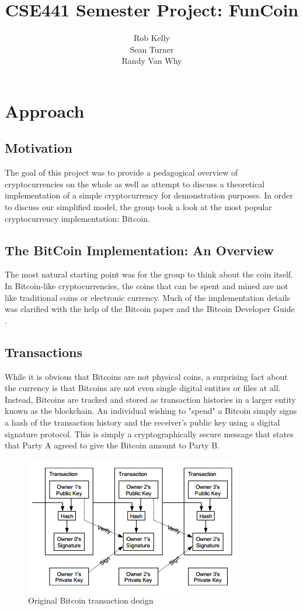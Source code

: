 \documentclass[12pt]{article}
\begin{document}
\title{CSE441 Semester Project: FunCoin}
\author{Rob Kelly\\Sean Turner\\Randy Van Why}
\maketitle


\section{Approach}
\subsection{Motivation}
The goal of this project was to provide a pedagogical overview of cryptocurrencies on the whole
as well as attempt to discuss a theoretical implementation of a simple cryptocurrency for
demonstration purposes. In order to discuss our simplified model, the group took a look at
the most popular cryptocurrency implementation: Bitcoin.

\subsection{The BitCoin Implementation: An Overview}
The most natural starting point was for the group to think about the coin itself.
In Bitcoin-like cryptocurrencies, the coins that can be spent and mined are not
like traditional coins or electronic currency. Much of the implementation details
was clarified with the help of the Bitcoin paper\cite{nakamoto:bitcoin} and the
Bitcoin Developer Guide \cite{dev:guide}. 

\subsection{Transactions}
While it is obvious that Bitcoins are not physical coins, a surprising fact about
the currency is that Bitcoins are not even single digital entities or files at all.
Instead, Bitcoins are tracked and stored as transaction histories in a larger entity
known as the blockchain. An individual wishing to "spend" a Bitcoin simply signs
a hash of the transaction history and the receiver's public key using a digital signature
protocol. This is simply a cryptographically secure message that states that Party A agreed
to give the Bitcoin amount to Party B.

\begin{figure}[h!]
  \centering
  \includegraphics[scale=1]{transaction.png}
  \caption{Original Bitcoin transaction design \cite{nakamoto:bitcoin}}
\end{figure}
\end{document}
